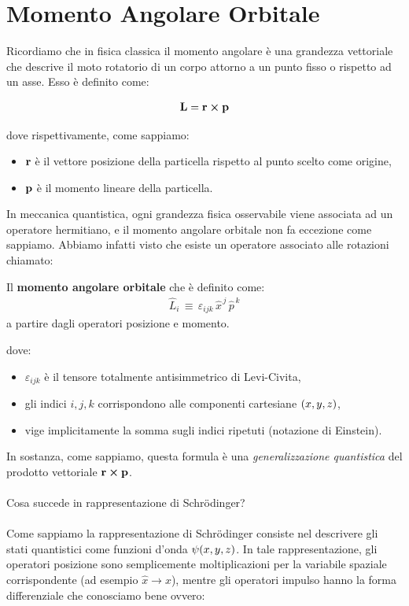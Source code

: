 \section{Momento Angolare Orbitale}

	Ricordiamo che in fisica classica il momento angolare è una grandezza vettoriale che descrive il moto rotatorio di un corpo attorno a un punto fisso o rispetto ad un asse. Esso è definito come:

\begin{align*}
	\vb{L} = \vb{r} \cp \vb{p} 
\end{align*}

	dove rispettivamente, come sappiamo:

\begin{itemize}
	\item $\vb{r}$ è il vettore posizione della particella rispetto al punto scelto come origine,
	\item $\vb{p}$ è il momento lineare della particella.
\end{itemize}

	In meccanica quantistica, ogni grandezza fisica osservabile viene associata ad un operatore hermitiano, e il momento angolare orbitale non fa eccezione come sappiamo. Abbiamo infatti visto che esiste un operatore associato alle rotazioni chiamato:
	
\begin{nb}
	Il \textbf{momento angolare orbitale} che è definito come:
\begin{align*}
	\hat{L}_i \, \equiv \, \varepsilon_{ijk} \, \hat{x}^{\, j} \, \hat{p}^{\, k} 
\end{align*}
	a partire dagli operatori posizione e momento.
\end{nb}
	
	dove:
	
\begin{itemize}
	\item $\varepsilon_{ijk}$ è il tensore totalmente antisimmetrico di Levi-Civita,
	\item gli indici $i, j, k$ corrispondono alle componenti cartesiane $\qty(x, y, z)$,
	\item vige implicitamente la somma sugli indici ripetuti (notazione di Einstein).
\end{itemize}

	In sostanza, come sappiamo, questa formula è una \textit{generalizzazione quantistica}  del prodotto vettoriale $\vb{r} \cp \vb{p}$.
	\\
	\\
	Cosa succede in rappresentazione di Schrödinger?
	\\
	\\
	Come sappiamo la rappresentazione di Schrödinger consiste nel descrivere gli stati quantistici come funzioni d'onda 
$\psi\qty(x, y, z)$. In tale rappresentazione, gli operatori posizione sono semplicemente moltiplicazioni per la variabile spaziale corrispondente (ad esempio $\hat{x} \to x$), mentre gli operatori impulso hanno la forma differenziale che conosciamo bene ovvero:

